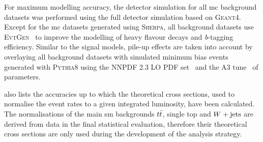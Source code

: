 For maximum modelling accuracy, the detector simulation for all \gls{mc} background datasets was performed using the full detector simulation based on \textsc{Geant4}. Except for the \gls{mc} datasets generated using \textsc{Sherpa}, all background datasets use \textsc{EvtGen}~\cite{Lange:2001uf} to improve the modelling of heavy flavour decays and \textit{b}-tagging efficiency. Similar to the signal models, pile-up effects are taken into account by overlaying all background datasets with simulated minimum bias events generated with \textsc{Pythia8} using the NNPDF 2.3 LO \gls{PDF} set~\cite{Ball:2012cx} and the A3 tune~\cite{ATL-PHYS-PUB-2016-017} of parameters. 

 also lists the accuracies up to which the theoretical cross sections, used to normalise the event rates to a given integrated luminosity, have been calculated. The normalisations of the main \gls{sm} backgrounds $t\bar{t}$, single top and $W+\mathrm{jets}$ are derived from data in the final statistical evaluation, therefore their theoretical cross sections are only used during the development of the analysis strategy.


